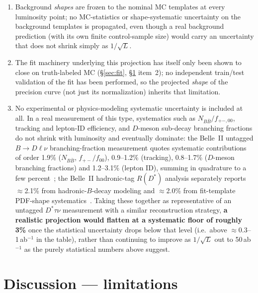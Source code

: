 \documentclass[11pt]{article}
\begin{document}
\begin{enumerate}
\item Background \emph{shapes} are frozen to the nominal MC templates at
  every luminosity point; no MC-statistics or shape-systematic
  uncertainty on the background templates is propagated, even though a
  real background prediction (with its own finite control-sample size)
  would carry an uncertainty that does not shrink simply as $1/\sqrt{L}$.
\item The fit machinery underlying this projection has itself only been
  shown to close on truth-labeled MC (\S\ref{sec:fit},
  \S\ref{sec:discussion} item~2); no independent train/test validation of
  the fit has been performed, so the projected \emph{shape} of the
  precision curve (not just its normalization) inherits that limitation.
\item No experimental or physics-modeling systematic uncertainty is
  included at all. In a real measurement of this type, systematics such
  as $N_{B\bar B}/f_{+-,00}$, tracking and lepton-ID efficiency, and
  $D$-meson sub-decay branching fractions do not shrink with luminosity
  and eventually dominate: the Belle~II untagged $B\to D\ell\nu$
  branching-fraction measurement quotes systematic contributions of order
  1.9\% ($N_{B\bar B}$, $f_{+-}/f_{00}$), 0.9--1.2\% (tracking),
  0.8--1.7\% ($D$-meson branching fractions) and 1.2--3.1\% (lepton ID),
  summing in quadrature to a few percent~\cite{BelleII:2210};
  the Belle~II hadronic-tag $R(D^{*})$ analysis separately reports
  $\approx$2.1\% from hadronic-$B$-decay modeling and $\approx$2.0\% from
  fit-template PDF-shape systematics~\cite{BelleII:2024}. Taking these together as representative of
  an untagged $D^{*}\tau\nu$ measurement with a similar reconstruction
  strategy, \textbf{a realistic projection would flatten at a systematic
  floor of roughly 3\%} once the statistical uncertainty drops below that
  level (i.e.\ above $\approx$0.3--1\,ab$^{-1}$ in the table), rather
  than continuing to improve as $1/\sqrt{L}$ out to 50\,ab$^{-1}$ as the
  purely statistical numbers above suggest.
\end{enumerate}

\section{Discussion --- limitations}
\label{sec:discussion}
\end{document}
